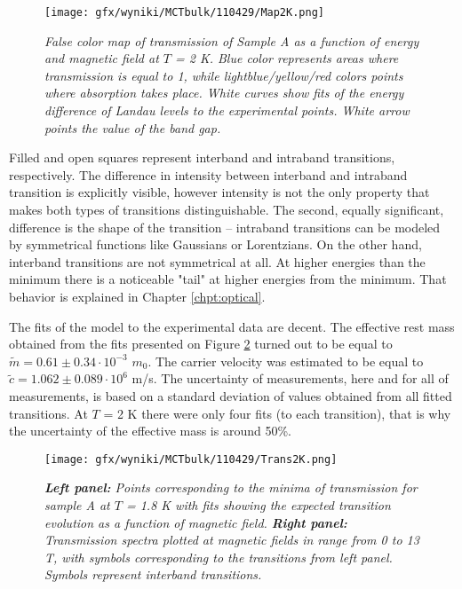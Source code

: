 \documentclass[titlepage,a4paper]{book}
\begin{document}
\begin{figure}[ht]
	\centering
	\texttt{[image: gfx/wyniki/MCTbulk/110429/Map2K.png]}
	\vspace{-10pt}
	\caption{\textit{False color map of transmission of Sample A as a function of energy and magnetic field at $T$ = 2 K. Blue color represents areas where transmission is equal to 1, while lightblue/yellow/red colors points where absorption takes place. White curves show fits of the energy difference of Landau levels to the experimental points. White arrow points the value of the band gap.}}
	\label{fig:Map_110429_2K}
\end{figure} 

Filled and open squares represent interband and intraband transitions, respectively. The difference in intensity between interband and intraband transition is explicitly visible, however intensity is not the only property that makes both types of transitions distinguishable. The second, equally significant, difference is the shape of the transition --  intraband transitions can be modeled by symmetrical functions like Gaussians or Lorentzians. On the other hand, interband transitions are not symmetrical at all. At higher energies than the minimum there is a noticeable "tail" at higher energies from the minimum. That behavior is explained in Chapter \ref{chpt:optical}. 

The fits of the model to the experimental data are decent. The effective rest mass obtained from the fits presented on Figure \ref{fig:Spectra_110429_2K} turned out to be equal to $\tilde m = 0.61 \pm 0.34 \cdot 10^{-3}$ $m_0$. The carrier velocity was estimated to be equal to $\tilde{c} = 1.062 \pm 0.089 \cdot 10^6$ m/s. The uncertainty of measurements, here and for all of measurements, is based on a standard deviation of values obtained from all fitted transitions. At $T$ = 2 K there were only four fits (to each transition), that is why the uncertainty of the effective mass is around 50\%.

\begin{figure}[H]
	\centering
	\texttt{[image: gfx/wyniki/MCTbulk/110429/Trans2K.png]}
	\vspace{-10pt}
	\caption{\textit{\textbf{Left panel:} Points corresponding to the minima of transmission for sample A at $T$ = 1.8 K with fits showing the expected transition evolution as a function of magnetic field. \textbf{Right panel:} Transmission spectra plotted at magnetic fields in range from 0 to 13 T, with symbols corresponding to the transitions from left panel. Symbols represent interband transitions.}}
	\label{fig:Spectra_110429_2K}
\end{figure} 
\end{document}
